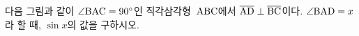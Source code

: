 다음 그림과 같이 $\angle\mathrm{BAC}=90^\circ$인 직각삼각형~$\mathrm{ABC}$에서 $\overline{\mathrm{AD}}\perp\overline{\mathrm{BC}}$이다. $\angle\mathrm{BAD}=x$라 할 때, $\sin x$의 값을 구하시오.
\par\smallskip\begin{center}\resizebox{\ifdim\width>\linewidth\linewidth\else\width\fi}{!}{}\end{center}
